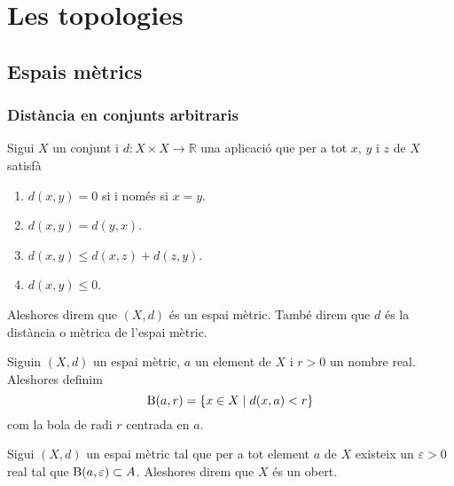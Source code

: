 \documentclass[../Apunts.tex]{subfiles}
\begin{document}
\chapter{Les topologies}
	\section{Espais mètrics}
	\subsection{Distància en conjunts arbitraris}
	\begin{definition}
		\label{def:espai mètric}
		\label{def:distància}
		Sigui \(X\) un conjunt i \(d\colon X\times X\longrightarrow\mathbb{R}\) una aplicació que per a tot \(x\), \(y\) i \(z\) de \(X\) satisfà
		\begin{enumerate}
			\item \(d(x,y)=0\) si i només si \(x=y\).
			\item \(d(x,y)=d(y,x)\).
			\item \(d(x,y)\leq d(x,z)+d(z,y)\).
			\item \(d(x,y)\leq0\).
		\end{enumerate}
		Aleshores direm que \((X,d)\) és un espai mètric. També direm que \(d\) és la distància o mètrica de l'espai mètric.
	\end{definition}
	\begin{definition}[Bola]
		\label{def:bola}
		Siguin \((X,d)\) un espai mètric, \(a\) un element de \(X\) i \(r>0\) un nombre real. Aleshores definim
		\[\operatorname{B}(a,r)=\{x\in X\mid d(x,a)<r\}\]
		com la bola de radi \(r\) centrada en \(a\).
	\end{definition}
	\begin{definition}[Obert]
		\label{def:obert}
		Sigui \((X,d)\) un espai mètric tal que per a tot element \(a\) de \(X\) existeix un \(\varepsilon>0\) real tal que \(\operatorname{B}(a,\varepsilon)\subset A\). Aleshores direm que \(X\) és un obert.
	\end{definition}
\end{document}
